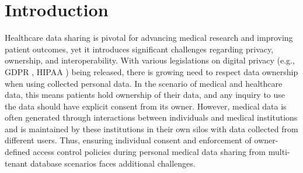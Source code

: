 \documentclass[conference]{IEEEtran}
\newcommand{\ours}{\xspace MtDB\xspace}
\begin{document}
    

\section{Introduction}
Healthcare data sharing is pivotal for advancing medical research and improving patient outcomes, yet it introduces significant challenges regarding privacy, ownership, and interoperability. With various legislations on digital privacy (e.g., GDPR \cite{gdprinfoGeneralData}, HIPAA \cite{nihHealthInsurance}) being released, there is growing need to respect data ownership when using collected personal data. In the scenario of medical and healthcare data, this means patients hold ownership of their data, and any inquiry to use the data should have explicit consent from its owner. However, medical data is often generated through interactions between individuals and medical institutions and is maintained by these institutions in their own silos with data collected from different users. Thus, ensuring individual consent and enforcement of owner-defined access control policies during personal medical data sharing from multi-tenant database scenarios faces additional challenges.
\end{document}
